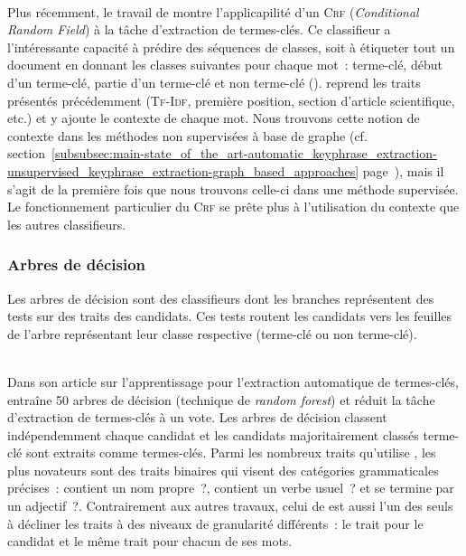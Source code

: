         ~\\Plus récemment, le travail de 
        montre l'applicapilité d'un \textsc{Crf} (\textit{Conditional Random
        Field}) à la tâche d'extraction de termes-clés. Ce classifieur a
        l'intéressante capacité à prédire des séquences de classes, soit à
        étiqueter tout un document en donnant les classes suivantes pour chaque
        mot~: \og{}terme-clé\fg{}, \og{}début d'un terme-clé\fg{}, \og{}partie
        d'un terme-clé\fg{} et \og{}non terme-clé\fg{} (). 
        reprend les traits présentés précédemment (\textsc{Tf-Idf}, première position,
        section d'article scientifique, etc.) et y ajoute le contexte de
        chaque mot. Nous trouvons cette notion de contexte dans les méthodes non
        supervisées à base de graphe (cf.
        section~\ref{subsubsec:main-state_of_the_art-automatic_keyphrase_extraction-unsupervised_keyphrase_extraction-graph_based_approaches}
        page~\pageref{subsubsec:main-state_of_the_art-automatic_keyphrase_extraction-unsupervised_keyphrase_extraction-graph_based_approaches}),
        mais il s'agit de la première fois que nous trouvons celle-ci dans une
        méthode supervisée. Le fonctionnement particulier du \textsc{Crf} se
        prête plus à l'utilisation du contexte que les autres classifieurs.

      \subsubsection{Arbres de décision}
      \label{subsubsec:main-state_of_the_art-automatic_keyphrase_extraction-supervised_keyphrase_extraction-decision_trees}
        Les arbres de décision sont des classifieurs dont les branches
        représentent des tests sur des traits des candidats. Ces tests routent
        les candidats vers les feuilles de l'arbre représentant leur classe
        respective (\og{}terme-clé\fg{} ou \og{}non terme-clé\fg{}).

        ~\\Dans son article sur l'apprentissage pour l'extraction automatique de
        termes-clés,  entraîne 50 arbres
        de décision (technique de \textit{random forest}) et réduit la tâche
        d'extraction de termes-clés à un vote. Les arbres de décision classent
        indépendemment chaque candidat et les candidats majoritairement
        classés \og{}terme-clé\fg{} sont extraits comme termes-clés. Parmi les
        nombreux traits qu'utilise , les
        plus novateurs sont des traits binaires qui visent des catégories
        grammaticales précises~: \og{}contient un nom propre~?\fg{},
        \og{}contient un verbe usuel~?\fg{} et \og{}se termine par un
        adjectif~?\fg{}. Contrairement aux autres travaux, celui de
         est aussi l'un des seuls à
        décliner les traits à des niveaux de granularité différents~: le trait
        pour le candidat et le même trait pour chacun de ses mots.

